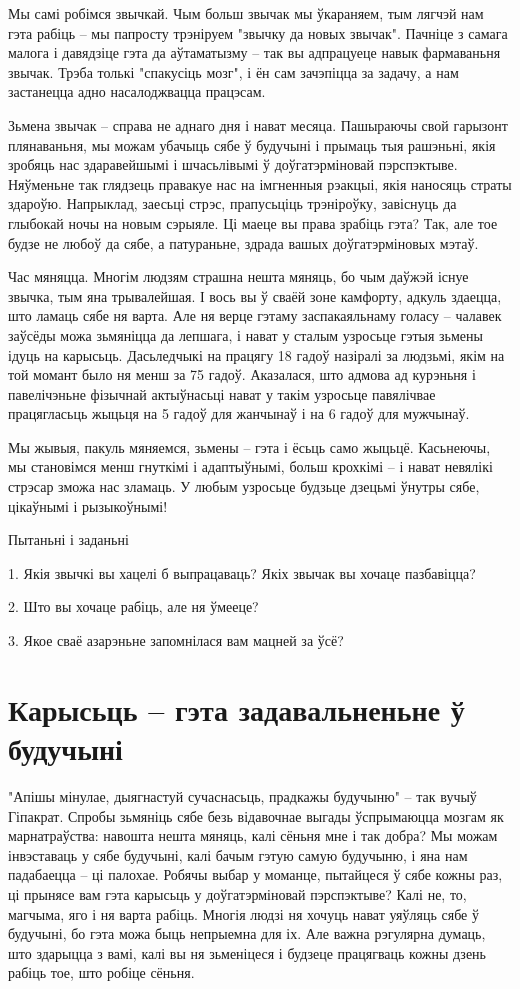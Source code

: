 Мы самі робімся звычкай. Чым больш звычак мы ўкараняем, тым лягчэй нам гэта рабіць – мы папросту трэніруем "звычку да новых звычак". Пачніце з самага малога і давядзіце гэта да аўтаматызму – так вы адпрацуеце навык фармаваньня звычак. Трэба толькі "спакусіць мозг", і ён сам зачэпіцца за задачу, а нам застанецца адно насалоджвацца працэсам.

Зьмена звычак – справа не аднаго дня і нават месяца. Пашыраючы свой гарызонт плянаваньня, мы можам убачыць сябе ў будучыні і прымаць тыя рашэньні, якія зробяць нас здаравейшымі і шчасьлівымі ў доўгатэрміновай пэрспэктыве. Няўменьне так глядзець правакуе нас на імгненныя рэакцыі, якія наносяць страты здароўю. Напрыклад, заесьці стрэс, прапусьціць трэніроўку, завіснуць да глыбокай ночы на новым сэрыяле. Ці маеце вы права зрабіць гэта? Так, але тое будзе не любоў да сябе, а патураньне, здрада вашых доўгатэрміновых мэтаў.

Час мяняцца. Многім людзям страшна нешта мяняць, бо чым даўжэй існуе звычка, тым яна трывалейшая. І вось вы ў сваёй зоне камфорту, адкуль здаецца, што ламаць сябе ня варта. Але ня верце гэтаму заспакаяльнаму голасу – чалавек заўсёды можа зьмяніцца да лепшага, і нават у сталым узросьце гэтыя зьмены ідуць на карысьць. Дасьледчыкі на працягу 18 гадоў назіралі за людзьмі, якім на той момант было ня менш за 75 гадоў. Аказалася, што адмова ад курэньня і павелічэньне фізычнай актыўнасьці нават у такім узросьце павялічвае працягласьць жыцьця на 5 гадоў для жанчынаў і на 6 гадоў для мужчынаў.

Мы жывыя, пакуль мяняемся, зьмены – гэта і ёсьць само жыцьцё. Касьнеючы, мы становімся менш гнуткімі і адаптыўнымі, больш крохкімі – і нават невялікі стрэсар зможа нас зламаць. У любым узросьце будзьце дзецьмі ўнутры сябе, цікаўнымі і рызыкоўнымі!

Пытаньні і заданьні

1. Якія звычкі вы хацелі б выпрацаваць? Якіх звычак вы хочаце пазбавіцца?

2. Што вы хочаце рабіць, але ня ўмееце?

3. Якое сваё азарэньне запомнілася вам мацней за ўсё?


\section{Карысьць – гэта задавальненьне ў будучыні}

"Апішы мінулае, дыягнастуй сучаснасьць, прадкажы будучыню" – так вучыў Гіпакрат. Спробы зьмяніць сябе безь відавочнае выгады ўспрымаюцца мозгам як марнатраўства: навошта нешта мяняць, калі сёньня мне і так добра? Мы можам інвэставаць у сябе будучыні, калі бачым гэтую самую будучыню, і яна нам падабаецца – ці палохае. Робячы выбар у моманце, пытайцеся ў сябе кожны раз, ці прынясе вам гэта карысьць у доўгатэрміновай пэрспэктыве? Калі не, то, магчыма, яго і ня варта рабіць. Многія людзі ня хочуць нават уяўляць сябе ў будучыні, бо гэта можа быць непрыемна для іх. Але важна рэгулярна думаць, што здарыцца з вамі, калі вы ня зьменіцеся і будзеце працягваць кожны дзень рабіць тое, што робіце сёньня.

